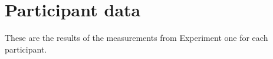 \chapter{Participant data}

These are the results of the measurements from Experiment one for each participant. 

\clearpage

\clearpage

\clearpage

\clearpage

\clearpage
